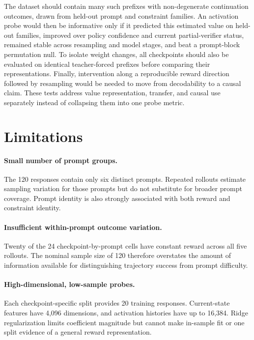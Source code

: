 \documentclass[manuscript,screen,nonacm]{acmart}
\begin{document}
The dataset should contain many such prefixes with non-degenerate continuation
outcomes, drawn from held-out prompt and constraint families. An activation
probe would then be informative only if it predicted this estimated value on
held-out families, improved over policy confidence and current partial-verifier
status, remained stable across resampling and model stages, and beat a
prompt-block permutation null. To isolate weight changes, all checkpoints
should also be evaluated on identical teacher-forced prefixes before comparing
their representations. Finally, intervention along a reproducible reward
direction followed by resampling would be needed to move from decodability to a
causal claim. These tests address value representation, transfer, and causal
use separately instead of collapsing them into one probe metric.

\section{Limitations}

\paragraph{Small number of prompt groups.}
The 120 responses contain only six distinct prompts. Repeated rollouts estimate
sampling variation for those prompts but do not substitute for broader prompt
coverage. Prompt identity is also strongly associated with both reward and
constraint identity.

\paragraph{Insufficient within-prompt outcome variation.}
Twenty of the 24 checkpoint-by-prompt cells have constant reward across all
five rollouts. The nominal sample size of 120 therefore overstates the amount
of information available for distinguishing trajectory success from prompt
difficulty.

\paragraph{High-dimensional, low-sample probes.}
Each checkpoint-specific split provides 20 training responses. Current-state
features have 4,096 dimensions, and activation histories have up to 16,384.
Ridge regularization limits coefficient magnitude but cannot make in-sample fit
or one split evidence of a general reward representation.
\end{document}
